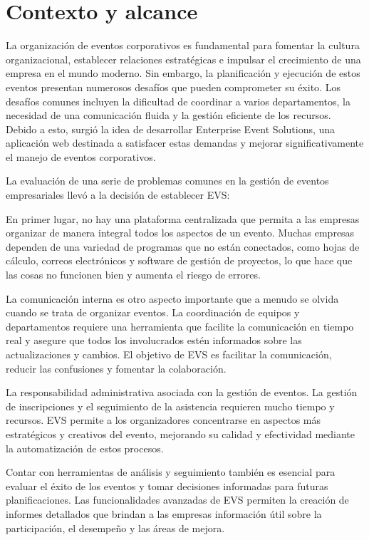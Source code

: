 
\section{Contexto y alcance}

La organización de eventos corporativos es fundamental para fomentar la cultura organizacional, 
establecer relaciones estratégicas e impulsar el crecimiento de una empresa en el mundo moderno. 
Sin embargo, la planificación y ejecución de estos eventos presentan numerosos desafíos que pueden comprometer su éxito. 
Los desafíos comunes incluyen la dificultad de coordinar a varios departamentos, la necesidad de una comunicación fluida y 
la gestión eficiente de los recursos. Debido a esto, surgió la idea de desarrollar Enterprise Event Solutions, una aplicación web destinada a satisfacer estas 
demandas y mejorar significativamente el manejo de eventos corporativos.

La evaluación de una serie de problemas comunes en la gestión de eventos empresariales llevó a la decisión de establecer EVS:

En primer lugar, no hay una plataforma centralizada que permita a las empresas organizar de manera integral todos los aspectos de un evento. 
Muchas empresas dependen de una variedad de programas que no están conectados, como hojas de cálculo, correos electrónicos y software de gestión de 
proyectos, lo que hace que las cosas no funcionen bien y aumenta el riesgo de errores.

La comunicación interna es otro aspecto importante que a menudo se olvida cuando se trata de organizar eventos. La coordinación de equipos y 
departamentos requiere una herramienta que facilite la comunicación en tiempo real y asegure que todos los involucrados estén informados sobre las 
actualizaciones y cambios. El objetivo de EVS es facilitar la comunicación, reducir las confusiones y fomentar la colaboración.

La responsabilidad administrativa asociada con la gestión de eventos. 
La gestión de inscripciones y el seguimiento de 
la asistencia requieren mucho tiempo y recursos. EVS permite a los organizadores 
concentrarse en aspectos más estratégicos y creativos del evento, mejorando su calidad y 
efectividad mediante la automatización de estos procesos.

Contar con herramientas de análisis y seguimiento también es esencial para evaluar el éxito de los eventos y tomar 
decisiones informadas para futuras planificaciones. Las funcionalidades avanzadas de EVS permiten la creación de informes 
detallados que brindan a las empresas información útil sobre la participación, el desempeño y las áreas de mejora.

